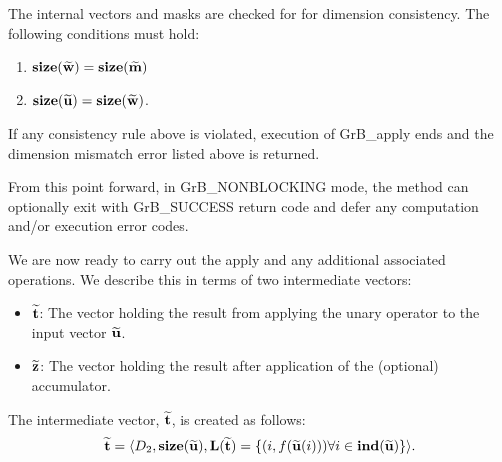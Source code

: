 The internal vectors and masks are checked for for dimension consistency. 
The following conditions must hold:
\begin{enumerate}
	\item $\bold{size}({\bf \widetilde{w}}) = \bold{size}({\bf \widetilde{m}})$
	\item $\bold{size}({\bf \widetilde{u}}) = \bold{size}({\bf \widetilde{w}})$.
\end{enumerate}
If any consistency rule above is violated, execution of {\sf GrB\_apply} ends and 
the dimension mismatch error listed above is returned.

From this point forward, in {\sf GrB\_NONBLOCKING} mode, the method can optionally exit
with {\sf GrB\_SUCCESS} return code and defer any computation and/or execution error codes.

We are now ready to carry out the apply and any additional 
associated operations.  We describe this in terms of two intermediate vectors:
\begin{itemize}
	\item ${\bf \widetilde{t}}$: The vector holding the result from applying the unary operator to the input vector
    ${\bf \widetilde{u}}$.
	\item ${\bf \widetilde{z}}$: The vector holding the result after 
    application of the (optional) accumulator.
\end{itemize}

The intermediate vector, ${\bf \widetilde{t}}$, is created as follows:
\[ 
{\bf \widetilde{t}} = \langle
D_2, \bold{size}({\bf \widetilde{u}}),
\bold{L}({\bf \widetilde{t}}) =
\{(i,f({\bf \widetilde{u}}(i))) \forall i \in \bold{ind}({\bf \widetilde{u}}) \} \rangle. 
\]

